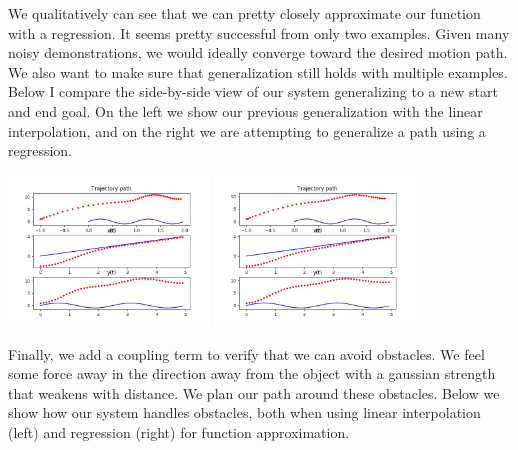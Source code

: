 \documentclass[12pt]{article}
\begin{document}
We qualitatively can see that we can pretty closely approximate our function with a regression. It seems pretty successful from only two examples. Given many noisy demonstrations, we would ideally converge toward the desired motion path. \\

We also want to make sure that generalization still holds with multiple examples. Below I compare the side-by-side view of our system generalizing to a new start and end goal. On the left we show our previous generalization with the linear interpolation, and on the right we are attempting to generalize a path using a regression.

\begin{center}
	\includegraphics[width=0.4\textwidth]{linear_generalization_spatial}
	\includegraphics[width=0.4\textwidth]{regression_generalization_spatial}
\end{center}

Finally, we add a coupling term to verify that we can avoid obstacles. We feel some force away in the direction away from the object with a gaussian strength that weakens with distance. We plan our path around these obstacles. Below we show how our system handles obstacles, both when using linear interpolation (left) and regression (right) for function approximation.
\end{document}
